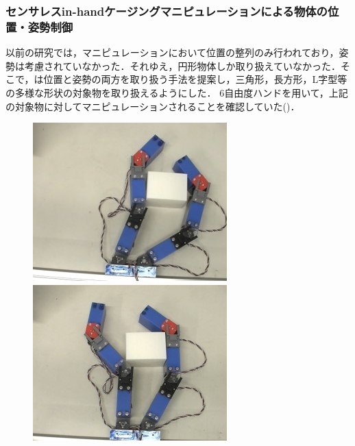 \documentclass[a4paper,twoside,12pt,papersize, dvipdfmx]{iirthesis}
\begin{document}
\subsubsection{センサレスin-handケージングマニピュレーションによる物体の位置・姿勢制御 \cite{komiyama2021}}
以前の研究\cite{asamura2013}では，マニピュレーションにおいて位置の整列のみ行われており，姿勢は考慮されていなかった．それゆえ，円形物体しか取り扱えていなかった．そこで，\cite{komiyama2021}は位置と姿勢の両方を取り扱う手法を提案し，三角形，長方形，L字型等の多様な形状の対象物を取り扱えるようにした．
6自由度ハンドを用いて，上記の対象物に対してマニピュレーションされることを確認していた()．
\begin{figure}[b]
\begin{minipage}{0.24\hsize}
\centering
\includegraphics[width=\hsize]{fig/1-introduction/mani1.jpg}
\subcaption{}
\end{minipage}\hfill
\begin{minipage}{0.24\hsize}
\centering
\includegraphics[width=\hsize]{fig/1-introduction/mani2.jpg}

\end{minipage}
\end{figure}
\end{document}
